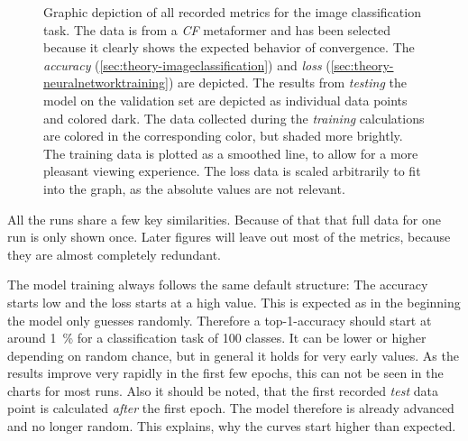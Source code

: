 \begin{figure}[htbp]
    \centering
    \caption{Graphic depiction of all recorded metrics for the image classification task.
    The data is from a \emph{CF} metaformer and has been selected because it clearly shows the expected behavior of convergence.
    The \emph{accuracy} (\autoref{sec:theory-imageclassification}) and \emph{loss} (\autoref{sec:theory-neuralnetworktraining}) are depicted. 
    The results from \emph{testing} the model on the validation set are depicted as individual data points and colored dark. 
    The data collected during the \emph{training} calculations are colored in the corresponding color, but shaded more brightly. The training data is plotted as a smoothed line, to allow for a more pleasant viewing experience.
    The loss data is scaled arbitrarily to fit into the graph, as the absolute values are not relevant. }
    \label{fig:comparison-recorded-values}
\end{figure}

All the runs share a few key similarities. Because of that that full data for one run is only shown once. 
Later figures will leave out most of the metrics, because they are almost completely redundant.

The model training always follows the same default structure: The accuracy starts low and the loss starts at a high value.
This is expected as in the beginning the model only guesses randomly. 
Therefore a top-1-accuracy should start at around \SI[]{1}[]{\percent} for a classification task of 100 classes.
It can be lower or higher depending on random chance, but in general it holds for very early values. 
As the results improve very rapidly in the first few epochs, this can not be seen in the charts for most runs.
Also it should be noted, that the first recorded \emph{test} data point is calculated \emph{after} the first epoch. 
The model therefore is already advanced and no longer random. 
This explains, why the curves start higher than expected.

